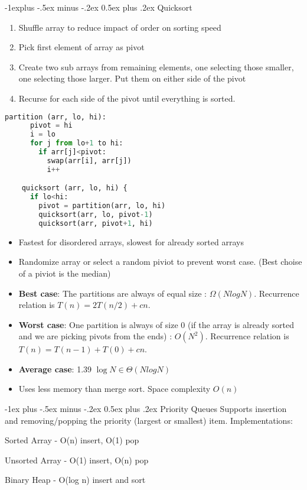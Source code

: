 \documentclass[letterpaper, 8pt]{extarticle}
\makeatletter
\renewcommand{\section}{\@startsection{section}{1}{0mm}%
                                {-1ex plus -.5ex minus -.2ex}%
                                {0.5ex plus .2ex}%
                                {\normalfont\normalsize\bfseries}}
\renewcommand{\subsection}{\@startsection{subsection}{2}{0mm}%
                                {-1explus -.5ex minus -.2ex}%
                                {0.5ex plus .2ex}%
                                {\normalfont\small\bfseries}}
\makeatother
\begin{document}
\begin{multicols*}{5}
  \subsection{Quicksort}
  \begin{enumerate}
    \item Shuffle array to reduce impact of order on sorting speed
    \item Pick first element of array as pivot
    \item Create two sub arrays from remaining elements, one selecting those smaller,
          one selecting those larger. Put them on either side of the pivot
    \item Recurse for each side of the pivot until everything is sorted.
  \end{enumerate}

  \begin{lstlisting}[language=Python, breaklines=true, postbreak=\mbox{\textcolor{red}{$\hookrightarrow$}\space}]
    partition (arr, lo, hi):
      pivot = hi
      i = lo
      for j from lo+1 to hi:
        if arr[j]<pivot:
          swap(arr[i], arr[j])
          i++

    quicksort (arr, lo, hi) {
      if lo<hi:
        pivot = partition(arr, lo, hi)
        quicksort(arr, lo, pivot-1)
        quicksort(arr, pivot+1, hi)
  \end{lstlisting}
  \begin{itemize}
    \item Fastest for disordered arrays, slowest for already sorted arrays
    \item Randomize array or select a random piviot to prevent worst case. (Best choise of a piviot is the median)
    \item \textbf{Best case}: The partitions are always of equal size : $\Omega(NlogN)$. Recurrence relation is $T(n) = 2T(n/2) + cn$.
    \item \textbf{Worst case}: One partition is always of size 0 (if the array is already sorted and we are picking pivots from the ends) : $O(N^2)$. Recurrence relation is $T(n) = T(n - 1) + T(0) + cn$.
    \item \textbf{Average case}: 1.39 $\log{N} \in \Theta(NlogN)$
    \item Uses less memory than merge sort. Space complexity $O(n)$
  \end{itemize}

  \section{Priority Queues}
  Supports insertion and removing/popping the priority (largest or smallest) item.
  Implementations:
  \begin{list}{}{}
    \item Sorted Array - O(n) insert, O(1) pop
    \item Unsorted Array - O(1) insert, O(n) pop
    \item Binary Heap - O(log n) insert and sort
  \end{list}


\end{multicols*}
\end{document}
